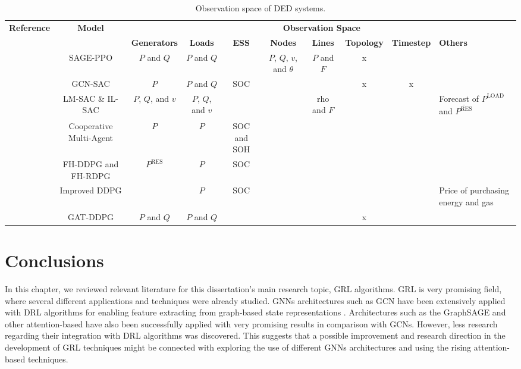\begin{sidewaystable}[H]
	\centering
	\caption{Observation space of \ac{DED} systems.}
	\begin{tabular}{cccccccccp{3cm}}
		\toprule
		\multirow{2}{*}{\textbf{Reference}} & \multirow{2}{*}{\textbf{Model}} & \multicolumn{8}{c}{\textbf{Observation Space}} \\ 
		\cmidrule(lr){3-10}
		&  &  \textbf{Generators} & \textbf{Loads} & \textbf{ESS} & \textbf{Nodes} & \textbf{Lines} & \textbf{Topology} & \textbf{Timestep} & \textbf{Others}\\ 
		\midrule
		\cite{zhaoGraphbasedDeepReinforcement2022} & SAGE-PPO & $P$ and $Q$  & $P$ and $Q$ & & $P$, $Q$, $v$, and $\theta$ & $P$ and $F$ & x & & \\
		\cite{liNovelGraphReinforcement2022, chenScalableGraphReinforcement2023} & GCN-SAC & $P$ & $P$ and $Q$ & $\text{SOC}$ & & & x & x & \\
		\cite{hanAutonomousControlTechnology2023} & LM-SAC \& IL-SAC & $P$, $Q$, and $v$ & $P$, $Q$, and $v$ & & & $\text{rho}$ and $F$ & & & Forecast of $P^\text{LOAD}$ and $\overline{P^\text{RES}}$\\
		\cite{liuDistributedEconomicDispatch2018} &  Cooperative Multi-Agent & $P$ & $P$ & $\text{SOC}$ and $\text{SOH}$ & & & & & \\
		\cite{leiDynamicEnergyDispatch2021} & FH-DDPG and FH-RDPG & $P^\text{RES}$ & $P$ & $\text{SOC}$ & & & & & \\
		\cite{yangDynamicEnergyDispatch2021} & Improved DDPG & & $P$ & $\text{SOC}$ & & & & &  Price of purchasing energy and gas \\
		\cite{xingRealtimeOptimalScheduling2023} & GAT-DDPG & $P$ and $Q$ & $P$ and $Q$ & & & & x &  & \\
		\bottomrule
	\end{tabular}
	\label{tab:ded-obs}
\end{sidewaystable}

\section{Conclusions} \label{sec:review-conclusion}

In this chapter, we reviewed relevant literature for this dissertation's main research topic, \ac{GRL} algorithms. \ac{GRL} is very promising field, where several different applications and techniques were already studied. \acp{GNN} architectures such as \ac{GCN} have been extensively applied with DRL algorithms for enabling feature extracting from graph-based state representations \cite{chenScalableGraphReinforcement2023, chenAutonomousExplorationUncertainty2020}. Architectures such as the GraphSAGE and other attention-based have also been successfully applied with very promising results \cite{peiEmergencyControlStrategy2023, xingRealtimeOptimalScheduling2023} in comparison with \acp{GCN}. However, less research regarding their integration with \ac{DRL} algorithms was discovered. This suggests that a possible improvement and research direction in the development of \ac{GRL} techniques might be connected with exploring the use of different \acp{GNN} architectures and using the rising attention-based techniques.

